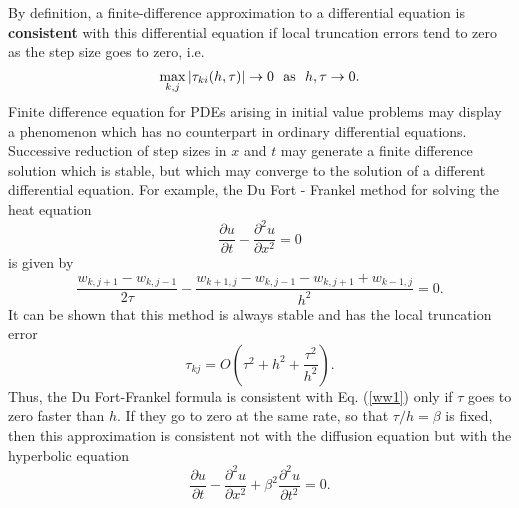  
By definition, a finite-difference approximation to a differential equation
is {\bf consistent} with this differential equation if local truncation errors
tend to zero as the step size goes to zero, i.e.
\[
\max_{k,j}\vert \tau_{ki}(h,\tau)\vert \to 0 \ \ {\rm as} \ \ h,\tau \to 0.
\]
Finite difference equation for PDEs arising in initial value
problems may display a phenomenon which has no counterpart in
ordinary differential equations. Successive reduction of step
sizes in $x$ and $t$ may generate a finite difference solution
which is stable, but which may converge to the solution of a
different differential equation. For example, the Du Fort -
Frankel method for solving the heat equation
\begin{equation}
\frac{\partial u}{\partial t}- \frac{\partial^{2}u}{\partial
x^{2}}=0 \label{ww1}
\end{equation}
is given by
\[
\frac{w_{k,j+1}-w_{k,j-1}}{2\tau}- \frac{w_{k+1,
j}-w_{k,j-1}-w_{k,j+1}+w_{k-1,j}}{h^{2}}=0.
\]
It can be shown that this method is always stable and has
the local truncation error
\[
\tau_{kj}=O\left(\tau^2+h^2+\frac{\tau^2}{h^2}\right).
\]
Thus, the Du Fort-Frankel formula is consistent with Eq. (\ref{ww1}) only
if $\tau$ goes to zero faster than $h$. If they go to zero
at the same rate, so that $\tau/h=\beta$ is fixed, then this approximation
is consistent not with the diffusion equation but with the hyperbolic equation
\[
\frac{\partial u}{\partial t}- \frac{\partial^{2}u}{\partial
x^{2}}+ \beta^2\frac{\partial^{2}u}{\partial t^{2}}=0.
\]





